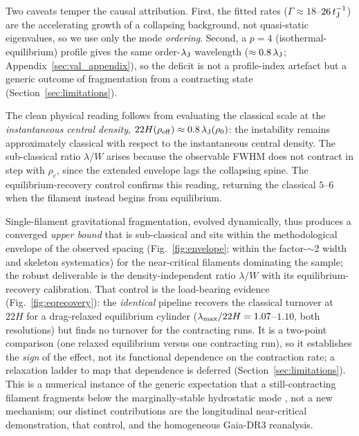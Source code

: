 \documentclass[usenatbib,twoside,twocolumn]{mnras}
\begin{document}
Two caveats temper the causal attribution. First, the fitted rates ($\Gamma\approx18$--$26\,t_{\rm J}^{-1}$) are the accelerating growth of a collapsing background, not quasi-static eigenvalues, so we use only the mode \emph{ordering}. Second, a $p=4$ (isothermal-equilibrium) profile gives the same order-$\lambda_{\rm J}$ wavelength ($\approx0.8\,\lambda_{\rm J}$; Appendix~\ref{sec:val_appendix}), so the deficit is not a profile-index artefact but a generic outcome of fragmentation from a contracting state (Section~\ref{sec:limitations}).

The clean physical reading follows from evaluating the classical scale at the \emph{instantaneous central density}, $22H(\rho_{\rm eff})\approx0.8\,\lambda_{\rm J}(\rho_0)$: the instability remains approximately classical with respect to the instantaneous central density. The sub-classical ratio $\lambda/W$ arises because the observable FWHM does not contract in step with $\rho_c$, since the extended envelope lags the collapsing spine. The equilibrium-recovery control confirms this reading, returning the classical $5$--$6$ when the filament instead begins from equilibrium.

Single-filament gravitational fragmentation, evolved dynamically, thus produces a converged \emph{upper bound} that is sub-classical and sits within the methodological envelope of the observed spacing (Fig.~\ref{fig:envelope}; within the factor-$\sim$2 width and skeleton systematics) for the near-critical filaments dominating the sample; the robust deliverable is the density-independent ratio $\lambda/W$ with its equilibrium-recovery calibration. That control is the load-bearing evidence (Fig.~\ref{fig:eqrecovery}): the \emph{identical} pipeline recovers the classical turnover at $22H$ for a drag-relaxed equilibrium cylinder ($\lambda_{\rm max}/22H=1.07$--$1.10$, both resolutions) but finds no turnover for the contracting runs. It is a two-point comparison (one relaxed equilibrium versus one contracting run), so it establishes the \emph{sign} of the effect, not its functional dependence on the contraction rate; a relaxation ladder to map that dependence is deferred (Section~\ref{sec:limitations}). This is a numerical instance of the generic expectation that a still-contracting filament fragments below the marginally-stable hydrostatic mode \citep{Clarke2016,Clarke2017,Clarke2020}, not a new mechanism; our distinct contributions are the longitudinal near-critical demonstration, that control, and the homogeneous Gaia-DR3 reanalysis.
\end{document}
